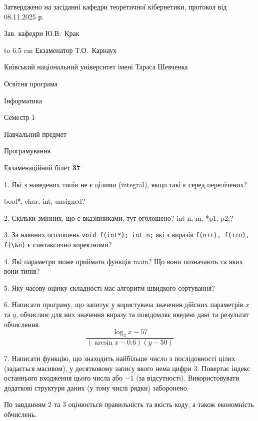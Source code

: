 \documentclass[12pt, ukrainian]{article}
\def\code#1{\Verb!#1!}
\begin{document}
{\smallskip\smallskip \begin {scriptsize} Затверджено на засіданні кафедри теоретичної кібернетики, протокол   від   08.11.2025 р.\par\smallskip\smallskip\smallskip\smallskip
{\parbox {6.5 cm} {Зав. кафедри \dotfill Ю.В.~Крак}}\hspace {0.7cm} {\hbox to 6.5 cm { Екзаменатор \dotfill Т.О.~Карнаух}} \end{scriptsize}}
\newpage
{{\begin {scriptsize}\par
{ \center  Київський національний університет імені Тараса Шевченка \par}
{\parbox {5 cm}{Освітня програма \hfill}{\parbox {7 cm}{Інформатика\hfill}}\parbox {6 cm}{\hfill Семестр 1}}\par
{\parbox {5 cm} {Навчальний предмет \hfill}\parbox {7 cm}{Програмування \hfill}\parbox {6cm}{\hfill}\par}\vspace{-15pt} \end{scriptsize}}{\center Екзаменаційний білет \No \textbf { 37 }\par}}
{%
1. Які з наведених типів не є цілими (integral), якщо такі є серед перелічених?

bool*, char, int, unsigned?
\par
\vspace{2mm}
2. Скільки змінних, що є вказівниками, тут оголошено?
int n, m, *p1, p2;?
\par
\vspace{2mm}
3. За наявних оголошень \code{void f(int*); int n;} які з виразів \code{f(n++), f(++n), f(\&n)} є синтаксично коректними?
\par
\vspace{2mm}
4. Які параметри може приймати функція main? Що вони позначають та яких вони типів?
\par
\vspace{2mm}
5. Яку часову оцінку складності має алгоритм швидкого сортування?
\par
\vspace{2mm}
6. Написати програму, що запитує у користувача значення дійсних параметрів $x$ та $y$, обчислює для них значення виразу та повiдомляє введенi данi та результат обчислення.
$$\frac{\log_{2} x - 57}{(\arcsin x - 0.6) (y - 50)}$$ 

\par
7. Написати функцію, що знаходить найбільше число з послідовності цілих (задається масивом), у десятковому запису якого нема цифри 3. Повертає індекс останнього входження цього числа або $-1$ (за відсутності). Використовувати додаткові структури даних (у тому числі рядки) заборонено.

По завданням 2 та 3 оцінюється правильність та якість коду, а також економність обчислень.

}
\end{document}
